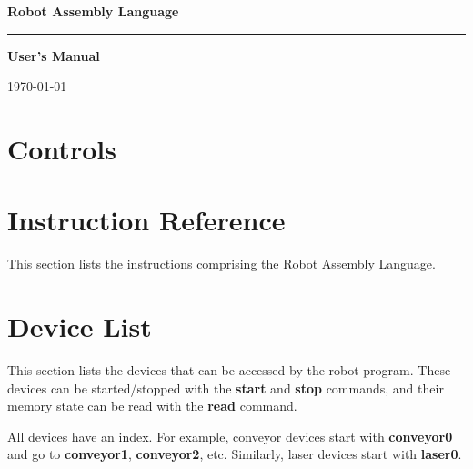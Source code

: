 \documentclass[12pt,a4paper]{article}
\begin{document}
\pagestyle{fancy}
\fancyhead{}
\fancyfoot[C]{\noindent\rule{\textwidth}{0.5pt}\par-\thepage-}

\begin{titlepage}
	\centering
	{\Huge\bfseries Robot Assembly Language\par}
	\vspace{1cm}
	\noindent\rule{\textwidth}{2pt}\par
	\vspace{4cm}
	{\Large\bfseries User's Manual\par}

	\vfill

	{\large \today\par}
\end{titlepage}

\tableofcontents
\pagebreak

\section{Controls}



\pagebreak

\section{Instruction Reference}
This section lists the instructions comprising the Robot Assembly Language.
\pagebreak



\section{Device List}
This section lists the devices that can be accessed by the robot program. These devices can be started/stopped with the \textbf{start} and \textbf{stop} commands, and their memory state can be read with the \textbf{read} command.

All devices have an index. For example, conveyor devices start with \textbf{conveyor0} and go to \textbf{conveyor1}, \textbf{conveyor2}, etc. Similarly, laser devices start with \textbf{laser0}.
\pagebreak



\end{document}
